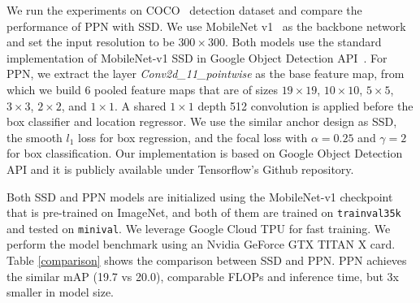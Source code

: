 \documentclass[10pt,twocolumn,letterpaper]{article}
\newcommand{\todo}[1]{\textcolor{red}{[Todo: #1]}}
\begin{document}
We run the experiments on COCO~\cite{lin2014coco} detection dataset
and compare the performance of PPN with SSD.
We use MobileNet v1~\cite{howard2017mobilenet} as the backbone network
and set the input resolution to be $300\times 300$.
Both models use the standard implementation of MobileNet-v1 SSD in
Google Object Detection API~\cite{huang2017gmi}.
For PPN,
we extract the layer \textit{Conv2d\_11\_pointwise} as the base feature map,
from which we build 6 pooled feature maps that are of sizes
$19\times 19$,
$10\times 10$,
$5\times 5$,
$3\times 3$,
$2\times 2$, and
$1\times 1$.
A shared $1\times 1$ depth 512 convolution is applied before the box classifier and location regressor.
We use the similar anchor design as SSD,
the smooth $l_{1}$ loss for box regression,
and the focal loss with $\alpha=0.25$ and $\gamma=2$ for box classification.
Our implementation is based on Google Object Detection API
and it is publicly available under Tensorflow's Github repository.

Both SSD and PPN models are initialized using the MobileNet-v1 checkpoint
that is pre-trained on ImageNet, and
both of them are trained on \texttt{trainval35k} and tested on \texttt{minival}.
We leverage Google Cloud TPU for fast training.
We perform the model benchmark using an Nvidia GeForce GTX TITAN X card.
Table \ref{comparison} shows the comparison between SSD and PPN.
PPN achieves the similar mAP (19.7 vs 20.0),
comparable FLOPs and inference time,
but 3x smaller in model size.



{\small


}
\end{document}
